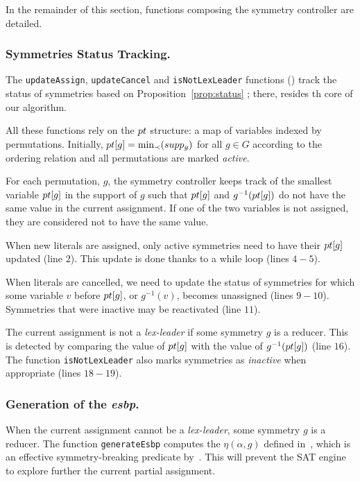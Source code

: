  \medskip\noindent In the remainder of this section, functions
 composing the symmetry controller are detailed.
 
 \subsubsection{Symmetries Status Tracking.} The \texttt{updateAssign},
 \texttt{updateCancel} and \texttt{isNot\-LexLeader} functions () track the status of symmetries based on
 Proposition~\ref{prop:status} ; there, resides th  core of our algorithm.
 
 All these functions rely on the $pt$ structure: a map of variables indexed
 by permutations. Initially, $pt[g] = \min_{\prec}(supp_g)$ for all $g \in G$ according to the ordering relation and all
 permutations are marked \textit{active}.
 
 For each permutation, $g$, the symmetry controller keeps track of the smallest
 variable $pt[g]$ in the support of $g$ such that $pt[g]$ and
 $g^{-1}(pt[g])$ do not have the same value in the current assignment. If
 one of the two variables is not assigned, they are considered not to have the
 same value.
 
 When new literals are assigned, only active symmetries need to have their
 $pt[g]$ updated (line $2$). This update is done thanks to a while
 loop (lines $4-5$).
 
 When literals are cancelled, we need to update the status of symmetries for
 which some variable $v$ before $pt[g]$, or $g^{-1}(v)$, becomes unassigned
 (lines $9-10$). Symmetries that were inactive may be reactivated (line $11$).
 
 The current assignment is not a \textit{lex-leader} if some symmetry $g$ is a
 reducer. This is detected by comparing the value of $pt[g]$ with the value
 of $g^{-1}(pt[g])$ (line $16$). The function \texttt{isNotLexLeader} also
 marks symmetries as \emph{inactive} when appropriate (lines $18-19$).
 
 \subsubsection{Generation of the \emph{esbp}.} When the current assignment
 cannot be a \textit{lex-leader}, some symmetry $g$ is a reducer. The function
 \texttt{generateEsbp} computes the $\eta(\alpha, g)$ defined in~,
 which is an effective symmetry-breaking predicate by~. This will
 prevent the SAT engine to explore further the current partial assignment.
 
